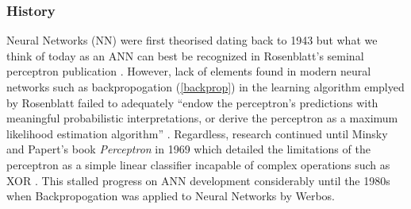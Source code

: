 \subsubsection{History}
Neural Networks (NN) were first theorised dating back to 1943 but what we think of today as an ANN can best be recognized in Rosenblatt's seminal perceptron publication \cite{Rosenblatt1958}. However, lack of elements found in modern neural networks such as backpropogation (\ref{backprop}) in the learning algorithm emplyed by Rosenblatt failed to adequately ``endow the perceptron’s predictions with meaningful probabilistic interpretations, or derive the perceptron as a maximum likelihood estimation algorithm'' \cite{Ng2011a}. Regardless, research continued until Minsky and Papert's book \textit{Perceptron} in 1969 which detailed the limitations of the perceptron as a simple linear classifier incapable of complex operations such as XOR \cite{Minsky1969a}. This stalled progress on ANN development considerably until the 1980s when Backpropogation was applied to Neural Networks by Werbos. \cite{Schmidhuber2015}